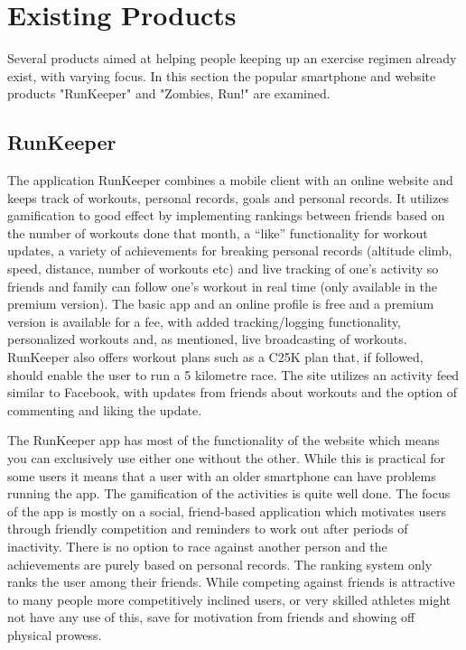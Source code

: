 \section{Existing Products}
Several products aimed at helping people keeping up an exercise regimen already exist, with varying focus. In this section the popular smartphone and website products "RunKeeper" and "Zombies, Run!" are examined. 

\subsection{RunKeeper}
The application RunKeeper combines a mobile client with an online website and keeps track of workouts, personal records, goals and personal records. It utilizes gamification to good effect by implementing rankings between friends based on the number of workouts done that month, a ``like'' functionality for workout updates, a variety of achievements for breaking personal records (altitude climb, speed, distance, number of workouts etc) and live tracking of one's activity so friends and family can follow one's workout in real time (only available in the premium version). The basic app and an online profile is free and a premium version is available for a fee, with added tracking/logging functionality, personalized workouts and, as mentioned, live broadcasting of workouts. RunKeeper also offers workout plans such as a \ac{C25K} plan that, if followed, should enable the user to run a 5 kilometre race. The site utilizes an activity feed similar to Facebook, with updates from friends about workouts and the option of commenting and liking the update. 

The RunKeeper app has most of the functionality of the website which means you can exclusively use either one without the other. While this is practical for some users it means that a user with an older smartphone can have problems running the app. The gamification of the activities is quite well done. The focus of the app is mostly on a social, friend-based application which motivates users through friendly competition and reminders to work out after periods of inactivity. There is no option to race against another person and the achievements are purely based on personal records. The ranking system only ranks the user among their friends. While competing against friends is attractive to many people more competitively inclined users, or very skilled athletes might not have any use of this, save for motivation from friends and showing off physical prowess.


